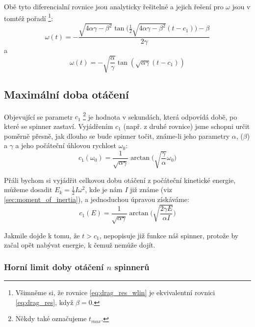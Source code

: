 \documentclass[12pt, a4paper,
 twoside,        %
 openright
]{report}
\begin{document}
Obě tyto diferencialní rovnice jsou analyticky řešitelné a jejich řešení pro $\omega$ jsou v tomtéž pořadí \footnote{Všimněme si, že rovnice \ref{eq:drag_res_wlin} je ekvivalentní rovnici \ref{eq:drag_res}, když $\beta = 0$.}:
\begin{equation}
    \label{eq:drag_res_wlin}
    \omega(t) = -\frac{\sqrt{4\alpha\gamma - \beta^2} \tan{(\frac{1}{2}\sqrt{4\alpha\gamma - \beta^2}(t-c_1)})-\beta}{2\gamma}
\end{equation}
a
\begin{equation}
    \label{eq:drag_res}
    \omega(t) = -\sqrt{\frac{\alpha}{\gamma}} \tan{(\sqrt{\alpha\gamma}(t-c_1))}
\end{equation}

\subsection{Maximální doba otáčení}

Objevující se parametr $c_1$ \footnote{Někdy také označujeme $t_{max}$.} je hodnota v sekundách, která odpovídá době, po které se spinner zastaví. Vyjádřením $c_1$ (např. z druhé rovnice) jsme schopni určit poměrně přesně, jak dlouho se bude spinner točit, známe-li jeho parametry $\alpha$, ($\beta$) a $\gamma$ a jeho počáteční úhlovou rychlost $\omega_0$:
\begin{equation}
    \label{eq:runtime_from_omeg0}
    c_1(\omega_0) = \frac{1}{\sqrt{\alpha\gamma}} \arctan{ \bigg( \sqrt{\frac{\gamma}{\alpha}} \omega_0 \bigg)}
\end{equation}

Přáli bychom si vyjádřit celkovou dobu otáčení z počáteční kinetické energie, můžeme dosadit $E_k = \frac{1}{2}I\omega^2$, kde je nám $I$ již známe (viz \autoref{sec:moment_of_inertia}), a jednoduchou úpravou získáváme:
\begin{equation}
    \label{eq:runtime_from_ene}
    c_1(E) = \frac{1}{\sqrt{\alpha\gamma}} \arctan{ \bigg( \sqrt{\frac{2 \gamma E}{\alpha I}} \bigg)}
\end{equation}

Jakmile dojde k tomu, že $t > c_1$, nepopisuje již funkce náš spinner, protože by začal opět nabývat energie, k čemuž nemůže dojít.

\clearpage

\subsubsection{Horní limit doby otáčení $n$ spinnerů}
\end{document}

